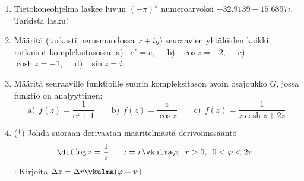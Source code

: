 \begin{enumerate}
\item
Tietokoneohjelma laskee luvun $(-\pi)^\pi$ numeroarvoksi $-32.9139-15.6897i$. Tarkista lasku! 

\item
Määritä (tarkasti perusmuodossa $x+iy$) seuraavien yhtälöiden kaikki ratkaisut 
kompleksitasossa: \newline
a) \ $e^z=e,\quad$ b) \ $\cos z=-2,\quad$ c) $\cosh z=-1,\quad$ d) \ $\sin z=i$.  

\item
Määritä seuraaville funktioille suurin kompleksitason avoin osajoukko $G$, jossa funktio on 
analyyttinen:
\[
\text{a)}\ \ f(z)=\frac{1}{e^z+1} \qquad \text{b)}\ \ f(z)=\frac{z}{\cos z} \qquad
\text{c)}\ \ f(z)=\frac{1}{z\cosh z+2z}
\]

\item (*) \label{H-exp-3: logaritmin derivaatta}
Johda suoraan derivaatan määritelmästä derivoimssääntö
\[
\dif\log z = \frac{1}{z}\,, \quad z=r\vkulma\varphi,\,\ r>0,\,\ 0<\varphi<2\pi.
\]
: Kirjoita $\Delta z=\Delta r\vkulma(\varphi+\psi)$.

\end{enumerate}